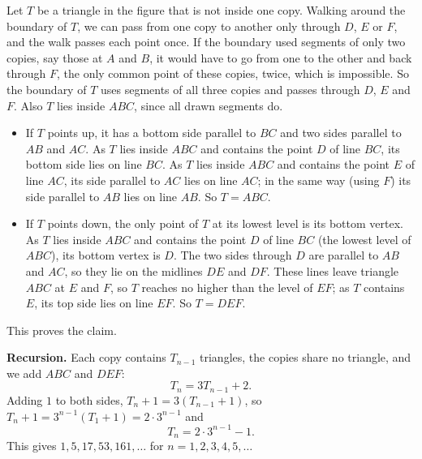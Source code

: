 Let $T$ be a triangle in the figure that is not inside one copy. Walking around the boundary of $T$, we can pass from one copy to another only through $D$, $E$ or $F$, and the walk passes each point once. If the boundary used segments of only two copies, say those at $A$ and $B$, it would have to go from one to the other and back through $F$, the only common point of these copies, twice, which is impossible. So the boundary of $T$ uses segments of all three copies and passes through $D$, $E$ and $F$. Also $T$ lies inside $ABC$, since all drawn segments do.
\begin{itemize}
\item If $T$ points up, it has a bottom side parallel to $BC$ and two sides parallel to $AB$ and $AC$. As $T$ lies inside $ABC$ and contains the point $D$ of line $BC$, its bottom side lies on line $BC$. As $T$ lies inside $ABC$ and contains the point $E$ of line $AC$, its side parallel to $AC$ lies on line $AC$; in the same way (using $F$) its side parallel to $AB$ lies on line $AB$. So $T=ABC$.
\item If $T$ points down, the only point of $T$ at its lowest level is its bottom vertex. As $T$ lies inside $ABC$ and contains the point $D$ of line $BC$ (the lowest level of $ABC$), its bottom vertex is $D$. The two sides through $D$ are parallel to $AB$ and $AC$, so they lie on the midlines $DE$ and $DF$. These lines leave triangle $ABC$ at $E$ and $F$, so $T$ reaches no higher than the level of $EF$; as $T$ contains $E$, its top side lies on line $EF$. So $T=DEF$.
\end{itemize}
This proves the claim.

\textbf{Recursion.} Each copy contains $T_{n-1}$ triangles, the copies share no triangle, and we add $ABC$ and $DEF$:
\[T_n=3T_{n-1}+2.\]
Adding $1$ to both sides, $T_n+1=3(T_{n-1}+1)$, so $T_n+1=3^{n-1}(T_1+1)=2\cdot3^{n-1}$ and
\[T_n=\boxed{2\cdot3^{n-1}-1}.\]
This gives $1,5,17,53,161,\dots$ for $n=1,2,3,4,5,\dots$
